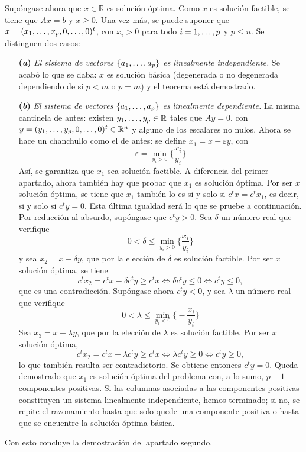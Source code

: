 \documentclass[11pt]{report}
\makeatletter
\renewenvironment{proof}[1][\proofname]{\par
  \pushQED{\qed}%
  \normalfont \topsep\z@skip %
  \trivlist
  \item[\hskip\labelsep
        \itshape
    #1\@addpunct{.}]\ignorespaces
}{%
  \popQED\endtrivlist\@endpefalse
}
\theoremstyle{mytheorem}
\theoremstyle{mydefinition}
\theoremstyle{myexample}
\let\oldproofname=\proofname
\renewcommand{\proofname}{\rm\bf{\oldproofname}}}
\newcommand{\R}{\mathbb R}
\makeatother
\begin{document}
\begin{proof}
Supóngase ahora que $x \in \R$ es solución óptima. Como $x$ es solución factible, se tiene que $Ax = b$ y $x \geq 0$. Una vez más, se puede suponer que $x = (x_1,\mathellipsis,x_p,0,\mathellipsis,0)^t$, con $x_i >0$ para todo $i = 1,\mathellipsis,p$ y $p \leq n$. Se distinguen dos casos:
\begin{itemize}
    \item[\textbf{(\textit{a})}] \textit{El sistema de vectores $\{a_1,\mathellipsis,a_p\}$ es linealmente independiente.} Se acabó lo que se daba: $x$ es solución básica (degenerada o no degenerada dependiendo de si $p <m$ o $p = m$) y el teorema está demostrado.
    \item[\textbf{(\textit{b})}] \textit{El sistema de vectores $\{a_1,\mathellipsis,a_p\}$ es linealmente dependiente.} La misma cantinela de antes: existen $y_1,\mathellipsis,y_p \in \R$ tales que $Ay = 0$, con $y = (y_1,\mathellipsis,y_p,0,\mathellipsis,0)^t \in \R^n$ y alguno de los escalares no nulos. Ahora se hace un chanchullo como el de antes: se define $x_1 = x-\varepsilon y$, con
    \[\varepsilon = \min_{y_i >0} \biggl\{\frac{x_i}{y_i}\biggr\}\] \normalsize
    Así, se garantiza que $x_1$ sea solución factible. A diferencia del primer apartado, ahora también hay que probar que $x_1$ es solución óptima. Por ser $x$ solución óptima, se tiene que $x_1$ también lo es si y solo si $c^tx = c^tx_1$, es decir, si y solo si $c^ty = 0$. Esta última igualdad será lo que se pruebe a continuación. Por reducción al absurdo, supóngase que $c^ty>0$. Sea $\delta$ un número real que verifique
    \[0 < \delta \leq \min_{y_i>0}\biggl\{\frac{x_i}{y_i}\biggr\}\] \normalsize
    y sea $x_2 = x-\delta y$, que por la elección de $\delta$ es solución factible. Por ser $x$ solución óptima, se tiene
    \[c^tx_2 = c^tx-\delta  c^t y \geq c^tx \iff \delta c^ty \leq 0 \iff c^ty \leq 0,\]
    que es una contradicción. Supóngase ahora $c^ty<0$, y sea $\lambda$ un número real que verifique
    \[0 < \lambda \leq \min_{y_i<0}\biggl\{-\frac{x_i}{y_i}\biggr\}\]\normalsize
    Sea $x_3 = x+\lambda y$, que por la elección de $\lambda$ es solución factible. Por ser $x$ solución óptima,
    \[c^tx_2 = c^tx+\lambda  c^t y \geq c^tx \iff \lambda c^ty \geq 0 \iff c^ty \geq 0,\]
    lo que también resulta ser contradictorio. Se obtiene entonces $c^ty = 0$. Queda demostrado que $x_1$ es solución óptima del problema con, a lo sumo, $p-1$ componentes positivas. Si las columnas asociadas a las componentes positivas constituyen un sistema linealmente independiente, hemos terminado; si no, se repite el razonamiento hasta que solo quede una componente positiva o hasta que se encuentre la solución óptima-básica.
\end{itemize}

\noindent Con esto concluye la demostración del apartado segundo.
\end{proof}
\end{document}
